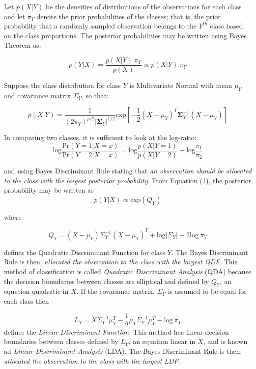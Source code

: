 \documentclass[12pt,]{article}
\begin{document}
Let \(p(X \vert Y)\) be the densities of distributions of the
observations for each class and let \(\pi_Y\) denote the prior
probabilities of the classes; that is, the prior probability that a
randomly sampled observation belongs to the \(Y^{th}\) class based on
the class proportions. The posterior probabilities may be written using
Bayes Theorem as:

\[
p(Y \vert X) = \frac{p(X \vert Y) ~\pi_Y}{p(X)} \propto p(X \vert Y) ~\pi_Y   \tag{1}
\]

Suppose the class distribution for class \(Y\) is Multivariate Normal
with mean \(\mu_Y\) and covariance matrix \(\Sigma_Y\), so that:

\[
p(X \vert Y) = \frac{1}{(2 \pi_Y)^{p/2} \vert\boldsymbol{\Sigma}_Y\vert ^{1/2}} \text{exp} \left[-\frac{1}{2}(X - \mu_Y)^T \boldsymbol{\Sigma}^{-1}_Y(X - \mu_Y)  \right]  \tag{2}
\]

In comparing two classes, it is sufficient to look at the log-ratio: \[
\text{log} \frac{\text{Pr}(Y=1 \vert X=x)}{\text{Pr}(Y=2 \vert X=x)} = \text{log}\frac{p(X \vert Y=1)}{p(X \vert Y=2)} + \text{log}\frac{\pi_1}{\pi_2}   \tag{3}
\]

and using Bayes Discriminant Rule stating that \emph{an observation
should be allocated to the class with the largest posterior
probability}. From Equation (1), the posterior probability may be
written as \[
p(Y \vert X) \propto \text{exp} \left( Q_Y \right)    \tag{4}
\]

where

\[
Q_Y = (X - \mu_Y) \Sigma^{-1}_Y (X - \mu_Y)^T + \text{log} \vert \Sigma_Y \vert - 2\text{log} ~\pi_Y   \tag{5}
\]

defines the Quadratic Discriminant Function for class \(Y\). The Bayes
Discriminant Rule is then: \emph{allocated the observation to the class
with the largest QDF}. This method of classification is called
\emph{Quadratic Discriminant Analysis} (QDA) because the decision
boundaries between classes are elliptical and defined by \(Q_Y\), an
equation quadratic in \(X\). If the covariance matrix, \(\Sigma_Y\) is
assumed to be equal for each class then

\[
L_Y = X \Sigma^{-1}_Y \mu_Y^T -\frac{1}{2}\mu_Y \Sigma^{-1}_Y \mu_Y^T  - \text{log} ~\pi_Y     \tag{6}
\] defines the \emph{Linear Discriminant Function}. This method has
linear decision boundaries between classes defined by \(L_Y\), an
equation linear in \(X\), and is known ad \emph{Linear Discriminant
Analysis} (LDA). The Bayes Discriminant Rule is then: \emph{allocated
the observation to the class with the largest LDF}.
\end{document}
